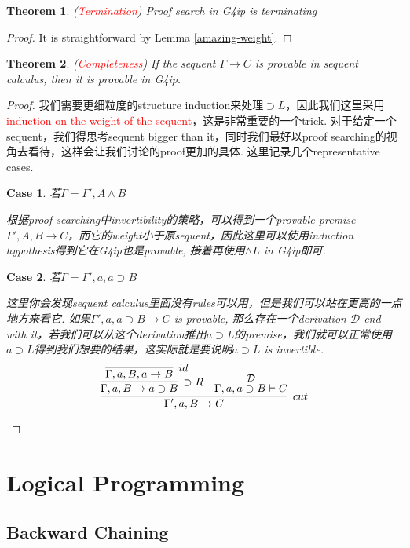 \documentclass{article}
\theoremstyle{plain}
\newtheorem{theorem}{Theorem}
\newcounter{case}
\newtheorem{case}{Case}
\theoremstyle{nonumberplain}
\newtheorem{proof}{Proof}
\newcommand{\redt}[1]{\textcolor{red}{#1}}
\begin{document}
\begin{theorem}
\rm (\redt{Termination}) Proof search in G4ip is terminating
\end{theorem}

\begin{proof}
It is straightforward by Lemma \ref{amazing-weight}.
\end{proof}

\begin{theorem}
\rm (\redt{Completeness}) If the sequent $\Gamma \to C$ is provable in sequent calculus, then it is provable in G4ip.
\end{theorem}


\begin{proof}
\rm 我们需要更细粒度的structure induction来处理$\supset L$，因此我们这里采用\redt{induction on the weight of the sequent}，这是非常重要的一个trick. 对于给定一个sequent，我们得思考sequent bigger than it，同时我们最好以proof searching的视角去看待，这样会让我们讨论的proof更加的具体. 这里记录几个representative cases. 
\begin{case}
若$\Gamma = \Gamma', A \wedge B$

根据proof searching中invertibility的策略，可以得到一个provable premise $\Gamma', A, B \to C$，而它的weight小于原sequent，因此这里可以使用induction hypothesis得到它在G4ip也是provable, 接着再使用$\wedge L$ in G4ip即可.
\end{case}
\begin{case}
若$\Gamma = \Gamma', a, a\supset B$

这里你会发现sequent calculus里面没有rules可以用，但是我们可以站在更高的一点地方来看它. 如果$\Gamma', a, a \supset B \to C$ is provable, 那么存在一个derivation $\mathcal{D}$ end with it，若我们可以从这个derivation推出$a \supset L$的premise，我们就可以正常使用$a \supset L$得到我们想要的结果，这实际就是要说明$a \supset L$ is invertible. 
$$
\infer[cut]{\Gamma',a, B \to C}{\infer[\supset R]{\Gamma,a,B \to a \supset B}{\infer[id]{\Gamma,a,B,a \to B}{}} & \deduce{\Gamma, a, a\supset B \vdash C}{\mathcal{D}}}
$$
\end{case}
\end{proof}

 
\newpage
\section{Logical Programming}

\subsection{Backward Chaining}
\end{document}
